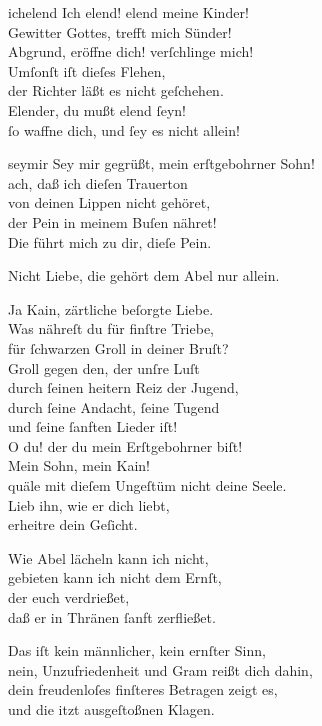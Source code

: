 \documentclass[tocstyle=ref-genre]{ees}
\begin{document}
{\begin{movement}{ichelend}
  \voice[Kain]
  Ich elend! elend meine Kinder!\\
  Gewitter Gottes, trefft mich Sünder!\\
  Abgrund, eröffne dich! verſchlinge mich!\\
  Umſonſt iſt dieſes Flehen,\\
  der Richter läßt es nicht geſchehen.\\
  Elender, du mußt elend ſeyn!\\
  ſo waffne dich, und ſey es nicht allein!
\end{movement}

\begin{movement}{seymir}
  \voice[Adam]
  Sey mir gegrüßt, mein erſtgebohrner Sohn!\\
  ach, daß ich dieſen Trauerton\\
  von deinen Lippen nicht gehöret,\\
  der Pein in meinem Buſen nähret!\\
  Die führt mich zu dir, dieſe Pein.

  \voice[Kain]
  Nicht Liebe, die gehört dem Abel nur allein.

  \voice[Adam]
  Ja Kain, zärtliche beſorgte Liebe.\\
  Was nähreſt du für finſtre Triebe,\\
  für ſchwarzen Groll in deiner Bruſt?\\
  Groll gegen den, der unſre Luſt\\
  durch ſeinen heitern Reiz der Jugend,\\
  durch ſeine Andacht, ſeine Tugend\\
  und ſeine ſanften Lieder iſt!\\
  O du! der du mein Erſtgebohrner biſt!\\
  Mein Sohn, mein Kain!\\
  quäle mit dieſem Ungeſtüm nicht deine Seele.\\
  Lieb ihn, wie er dich liebt,\\
  erheitre dein Geſicht.

  \voice[Kain]
  Wie Abel lächeln kann ich nicht,\\
  gebieten kann ich nicht dem Ernſt,\\
  der euch verdrießet,\\
  daß er in Thränen ſanft zerfließet.

  \voice[Adam]
  Das iſt kein männlicher, kein ernſter Sinn,\\
  nein, Unzufriedenheit und Gram reißt dich dahin,\\
  dein freudenloſes finſteres Betragen zeigt es,\\
  und die itzt ausgeſtoßnen Klagen.


\end{movement}}
\end{document}
